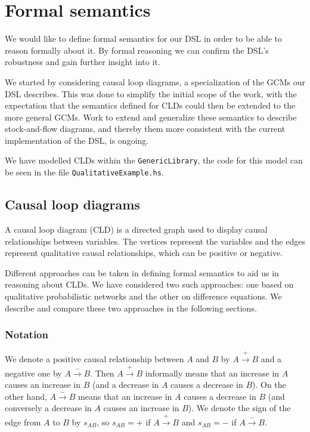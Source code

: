 \section{Formal semantics}
\label{sec:semantics}
We would like to define formal semantics for our DSL in order to be
able to reason formally about it.
%
By formal reasoning we can confirm the DSL's robustness and gain
further insight into it.

We started by considering causal loop diagrams, a specialization of
the GCMs our DSL describes.
%
This was done to simplify the initial scope of the work, with the
expectation that the semantics defined for CLDs could then be extended
to the more general GCMs.
%
Work to extend and generalize these semantics to describe
stock-and-flow diagrams, and thereby them more consistent with the
current implementation of the DSL, is ongoing.

We have modelled CLDs within the \verb|GenericLibrary|, the code for
this model can be seen in the file \verb|QualitativeExample.hs|.
%

\subsection{Causal loop diagrams}
%
A causal loop diagram (CLD) is a directed graph used to display causal
relationships between variables.
%
The vertices represent the variables and the edges represent
qualitative causal relationships, which can be positive or negative.

Different approaches can be taken in defining formal semantics to aid
us in reasoning about CLDs.
%
We have considered two such approaches: one based on qualitative
probabilistic networks and the other on difference equations.
%
We describe and compare these two approaches in the following
sections.

\subsubsection{Notation}
We denote a positive causal relationship between $A$ and $B$ by
$A\xrightarrow{+} B$ and a negative one by $A \xrightarrow{-} B$.
%
Then $A \xrightarrow{+} B$ informally means that an increase in $A$
causes an increase in $B$ (and a decrease in $A$ causes a decrease in
$B$).
%
On the other hand, $A\xrightarrow{-} B$ means that an increase in $A$
causes a decrease in $B$ (and conversely a decrease in $A$ causes an
increase in $B$).
%
We denote the sign of the edge from $A$ to $B$ by $s_{AB}$, so
$s_{AB}= +$ if $A\xrightarrow{+} B$ and $s_{AB}=-$ if
$A\xrightarrow{-} B$.

